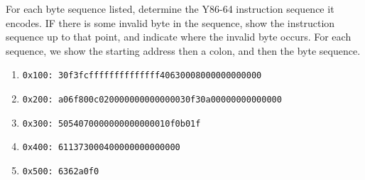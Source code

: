 \documentclass[12pt]{article}
\newenvironment{ex}[2][Exercise]{\begin{trivlist}
		\item[\hskip \labelsep {\bfseries #1}\hskip \labelsep {\bfseries #2.}]}{\end{trivlist}}
\begin{document}
\begin{ex}{4.2}
	For each byte sequence listed, determine the Y86-64 instruction
	sequence it encodes. IF there is some invalid byte in the sequence,
	show the instruction sequence up to that point, and indicate where
	the invalid byte occurs. For each sequence, we show the starting
	address then a colon, and then the byte sequence.
	\begin{enumerate}[label=(\alph*)]
		\item
			\texttt{0x100: 30f3fcffffffffffffff40630008000000000000}
		
		\item 
			\texttt{0x200: a06f800c020000000000000030f30a00000000000000}
		\item 
			\texttt{0x300: 5054070000000000000010f0b01f}
		\item 
			\texttt{0x400: 611373000400000000000000}
		\item 
			\texttt{0x500: 6362a0f0}
	\end{enumerate}
\end{ex}
\end{document}
